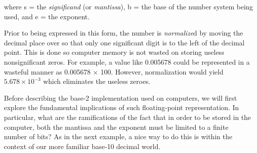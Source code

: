 \documentclass[../main.tex]{subfiles}
\begin{document}
\noindent
where s = the \emph{significand} (or \emph{mantissa}), b = the base of the number system being used, and
e = the exponent.

Prior to being expressed in this form, the number is \emph{normalize}d by moving the decimal
place over so that only one significant digit is to the left of the decimal point. This is done so
computer memory is not wasted on storing useless nonsignificant zeros. For example, a value
like 0.005678 could be represented in a wasteful manner as 0.005678 × 100. However, normalization
would yield $5.678 \times 10^{-3}$ which eliminates the useless zeroes.

Before describing the base-2 implementation used on computers, we will first explore
the fundamental implications of such floating-point representation. In particular,
what are the ramifications of the fact that in order to be stored in the computer, both
the mantissa and the exponent must be limited to a finite number of bits? As in the
next example, a nice way to do this is within the context of our more familiar base-10
decimal world.\\
\end{document}
